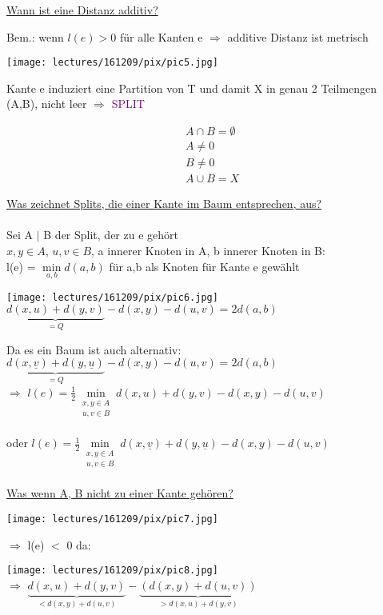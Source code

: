 \newpage
\underline{Wann ist eine Distanz additiv?}

Bem.: wenn $l(e) > 0$ für alle Kanten e $\Rightarrow$ additive Distanz ist metrisch

\begin{center}
	\texttt{[image: lectures/161209/pix/pic5.jpg]}
\end{center}

Kante e induziert eine Partition von T und damit X in genau 2 Teilmengen (A,B), nicht leer $\Rightarrow$ \textcolor{purple}{SPLIT}

\begin{align*}
 	&A \cap B = \emptyset \\
 	&A \neq 0 \\
 	&B \neq 0 \\
 	&A \cup B = X
\end{align*}

\underline{Was zeichnet Splits, die einer Kante im Baum entsprechen, aus?}\\\\
Sei A $|$ B der Split, der zu e gehört\\
$x,y \in A$, $u,v \in B$, a innerer Knoten in A, b innerer Knoten in B:\\
l(e) = $\min \limits_{a,b} d(a,b)$ für a,b als Knoten für Kante e gewählt


\begin{center}
	\texttt{[image: lectures/161209/pix/pic6.jpg]}\\
	$\underbrace{d(x,u) + d(y,v)}_{=Q} - d(x,y) - d(u,v) = 2d(a,b)$
\end{center}

\newpage

Da es ein Baum ist auch alternativ:
$\underbrace{d(x,\underline{v}) + d(y,\underline{u})}_{=Q} - d(x,y) - d(u,v) = 2d(a,b)$\\
$\Rightarrow$ $l(e) = \frac{1}{2} \min \limits_{\substack{x,y \in A\\ u,v \in B}} d(x,u) + d(y,v) - d(x,y) - d(u,v)$\\\\
oder $l(e) = \frac{1}{2} \min \limits_{\substack{x,y \in A\\ u,v \in B}} d(x,\underline{v}) + d(y,\underline{u}) - d(x,y) - d(u,v)$
\\\\
\underline{Was wenn A, B nicht zu einer Kante gehören?}
\begin{center}
	\texttt{[image: lectures/161209/pix/pic7.jpg]}
\end{center}
$\Rightarrow$ l(e) $<$ 0 da:
\begin{center}
	\texttt{[image: lectures/161209/pix/pic8.jpg]}\\
	$\Rightarrow$ $\underbrace{d(x,u) + d(y,v)}_{<d(x,y) + d(u,v)} - \underbrace{(d(x,y) + d(u,v))}_{>d(x,u) + d(y,v)}$
\end{center}

